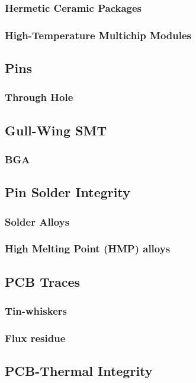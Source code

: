 \documentclass{article}
\begin{document}
	\subsubsection{Hermetic Ceramic Packages}
	\subsubsection{High-Temperature Multichip Modules}
	
\subsection{Pins}
	\subsubsection{Through Hole}
	\subsection{Gull-Wing SMT}
	\subsubsection{BGA}
	
\subsection{Pin Solder Integrity}
	\subsubsection{Solder Alloys}
	\subsubsection{High Melting Point (HMP) alloys}
	
\subsection{PCB Traces}
	\subsubsection{Tin-whiskers}
	\subsubsection{Flux residue}
	
\subsection{PCB-Thermal Integrity}
\end{document}

